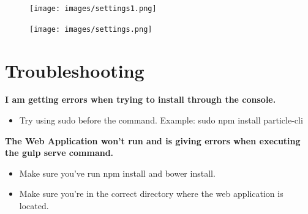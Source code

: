 \documentclass[a4paper,10pt]{article}
\begin{document}
	\begin{figure}[H]
		\texttt{[image: images/settings1.png]}
	\end{figure}
	
	\begin{figure}[H]
		\texttt{[image: images/settings.png]}
	\end{figure}
	
	\newpage
	\section{Troubleshooting}
	\textbf{I am getting errors when trying to install through the console.}
	\begin{itemize}
		\item Try using sudo before the command. Example: sudo npm install particle-cli
	\end{itemize}
	
	\textbf{The Web Application won't run and is giving errors when executing the gulp serve command.} 
	\begin{itemize}
		\item Make sure you've run npm install and bower install.
		\item Make sure you're in the correct directory where the web application is located.
	\end{itemize}
\end{document}
